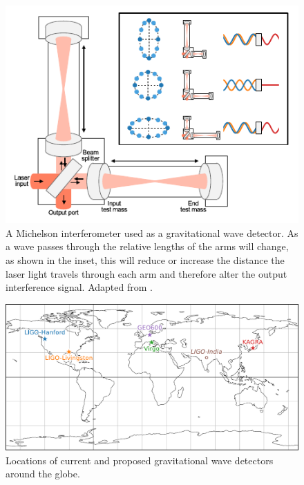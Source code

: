 \begin{colsection}
\begin{colsection}
\begin{figure}[t]
    \begin{center}
        \includegraphics[width=0.75\linewidth]{images/detector.pdf}
    \end{center}
    \caption[A Michelson interferometer used as a gravitational wave detector]{
        A Michelson interferometer used as a gravitational wave detector. As a wave passes through the relative lengths of the arms will change, as shown in the inset, this will reduce or increase the distance the laser light travels through each arm and therefore alter the output interference signal. Adapted from \citet{GW150914_detectors}.
        }\label{fig:detector}
\end{figure}

\newpage

\begin{figure}[t]
    \begin{center}
        \includegraphics[width=0.9\linewidth]{images/global.pdf}
    \end{center}
    \caption[Locations of gravitational wave detectors]{
        Locations of current and proposed gravitational wave detectors around the globe.
        }\label{fig:global}
\end{figure}


\end{colsection}
\end{colsection}
